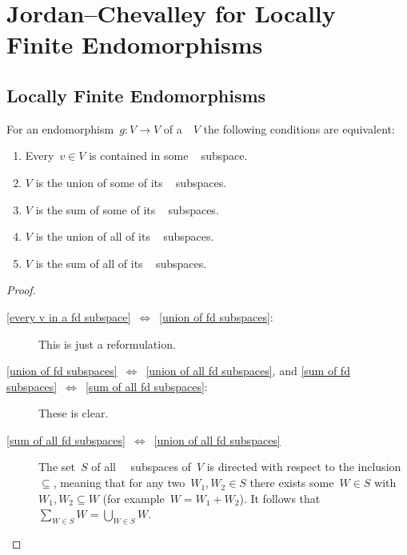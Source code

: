 \section{Jordan--Chevalley for Locally Finite Endomorphisms}





\subsection{Locally Finite Endomorphisms}


\begin{lemma}
  \label{characterization of locally finite endomorphisms}
  For an endomorphism~$g \colon V \to V$ of a~{\kvs}~$V$ the following conditions are equivalent:
  \begin{enumerate}
    \item
      \label{every v in a fd subspace}
      Every~$v \in V$ is contained in some {\fd}~ subspace.
    \item
      \label{union of fd subspaces}
      $V$ is the union of some of its {\fd}~ subspaces.
    \item
      \label{sum of fd subspaces}
      $V$ is the sum of some of its {\fd}~ subspaces.
    \item
      \label{union of all fd subspaces}
      $V$ is the union of all of its {\fd}~ subspaces.
    \item
      \label{sum of all fd subspaces}
      $V$ is the sum of all of its {\fd}~ subspaces.
  \end{enumerate}
\end{lemma}


\begin{proof}
  \leavevmode
  \begin{description}
    \item[\ref*{every v in a fd subspace}~$\iff$~\ref*{union of fd subspaces}:]
      This is just a reformulation.
    \item[\ref*{union of fd subspaces}~$\iff$~\ref*{union of all fd subspaces}, and \ref*{sum of fd subspaces}~$\iff$~\ref*{sum of all fd subspaces}:]
      These is clear.
    \item[\ref*{sum of all fd subspaces}~$\iff$~\ref*{union of all fd subspaces}]
      The set~$S$ of all~{\fd}~ subspaces of~$V$ is directed with respect to the inclusion~$\subseteq$, meaning that for any two~$W_1, W_2 \in S$ there exists some~$W \in S$ with~$W_1, W_2 \subseteq W$ (for example~$W = W_1 + W_2$).
      It follows that~$\sum_{W \in S} W = \bigcup_{W \in S} W$.
    \qedhere
  \end{description}
\end{proof}


